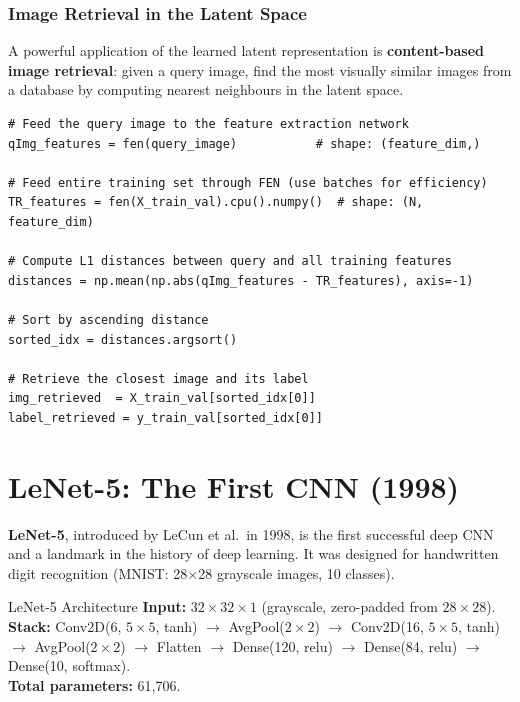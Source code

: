 \documentclass[11pt,a4paper]{article}
\newcommand{\term}[1]{\textcolor{DefGreen}{\textbf{#1}}}
\begin{document}
\subsubsection{Image Retrieval in the Latent Space}

A powerful application of the learned latent representation is \term{content-based image retrieval}: given a query image, find the most visually similar images from a database by computing nearest neighbours in the latent space.

\begin{lstlisting}[caption={1-NN image retrieval using CNN latent representation (PyTorch)}]
# Feed the query image to the feature extraction network
qImg_features = fen(query_image)           # shape: (feature_dim,)

# Feed entire training set through FEN (use batches for efficiency)
TR_features = fen(X_train_val).cpu().numpy()  # shape: (N, feature_dim)

# Compute L1 distances between query and all training features
distances = np.mean(np.abs(qImg_features - TR_features), axis=-1)

# Sort by ascending distance
sorted_idx = distances.argsort()

# Retrieve the closest image and its label
img_retrieved  = X_train_val[sorted_idx[0]]
label_retrieved = y_train_val[sorted_idx[0]]
\end{lstlisting}

\section{LeNet-5: The First CNN (1998)}
\label{sec:lenet}

\term{LeNet-5}, introduced by LeCun et al.\ in 1998, is the first successful deep CNN and a landmark in the history of deep learning. It was designed for handwritten digit recognition (MNIST: 28$\times$28 grayscale images, 10 classes).

\begin{defbox}{LeNet-5 Architecture}
\textbf{Input:} $32\times32\times1$ (grayscale, zero-padded from $28\times28$).\\
\textbf{Stack:} Conv2D(6, $5\times5$, tanh) $\to$ AvgPool($2\times2$) $\to$ Conv2D(16, $5\times5$, tanh) $\to$ AvgPool($2\times2$) $\to$ Flatten $\to$ Dense(120, relu) $\to$ Dense(84, relu) $\to$ Dense(10, softmax).\\
\textbf{Total parameters:} 61,706.
\end{defbox}
\end{document}

